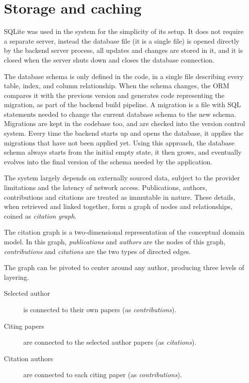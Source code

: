 \section{Storage and caching} \label{sec:storage-caching}

\textsf{SQLite} was used in the system for the simplicity of its setup.
It does not require a separate server, instead the database file (it is a single file) is opened directly by the backend server process, all updates and changes are stored in it, and it is closed when the server shuts down and closes the database connection.

The database schema is only defined in the code, in a single file describing every table, index, and column relationship.
When the schema changes, the ORM compares it with the previous version and generates code representing the migration, as part of the backend build pipeline.
A migration is a file with SQL statements needed to change the current database schema to the new schema.
Migrations are kept in the codebase too, and are checked into the version control system.
Every time the backend starts up and opens the database, it applies the migrations that have not been applied yet.
Using this approach, the database schema always starts from the initial empty state, it then grows, and eventually evolves into the final version of the schema needed by the application.

The system largely depends on externally sourced data, subject to the provider limitations and the latency of network access.
Publications, authors, contributions and citations are treated as immutable in nature.
These details, when retrieved and linked together, form a graph of nodes and relationships, coined as \emph{citation graph}. 

The citation graph is a two-dimensional representation of the conceptual domain model.
In this graph, \emph{publications} and \emph{authors} are the nodes of this graph, \emph{contributions} and \emph{citations} are the two types of directed edges.

The graph can be pivoted to center around any author, producing three levels of layering.

\begin{description}
    \item [Selected author] is connected to their own papers (as \emph{contributions}).
    \item [Citing papers] are connected to the selected author papers (as \emph{citations}).
    \item [Citation authors] are connected to each citing paper (as \emph{contributions}).
\end{description}

